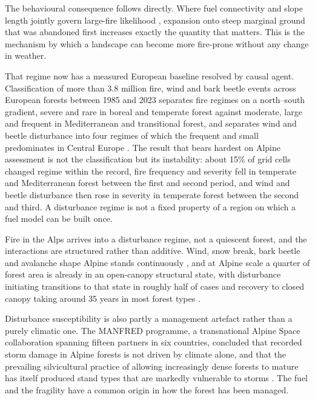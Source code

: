 \documentclass[11pt,a4paper]{article}
\begin{document}
The behavioural consequence follows directly. Where fuel connectivity and slope length jointly govern large-fire likelihood \citep{conedera_linking_2024}, expansion onto steep marginal ground that was abandoned first increases exactly the quantity that matters. This is the mechanism by which a landscape can become more fire-prone without any change in weather.

That regime now has a measured European baseline resolved by causal agent. Classification of more than 3.8 million fire, wind and bark beetle events across European forests between 1985 and 2023 separates fire regimes on a north--south gradient, severe and rare in boreal and temperate forest against moderate, large and frequent in Mediterranean and transitional forest, and separates wind and beetle disturbance into four regimes of which the frequent and small predominates in Central Europe \citep{miguel_unravelling_2026}. The result that bears hardest on Alpine assessment is not the classification but its instability: about 15\% of grid cells changed regime within the record, fire frequency and severity fell in temperate and Mediterranean forest between the first and second period, and wind and beetle disturbance then rose in severity in temperate forest between the second and third. A disturbance regime is not a fixed property of a region on which a fuel model can be built once.

Fire in the Alps arrives into a disturbance regime, not a quiescent forest, and the interactions are structured rather than additive. Wind, snow break, bark beetle and avalanche shape Alpine stands continuously \citep{bebi_changes_2017}, and at Alpine scale a quarter of forest area is already in an open-canopy structural state, with disturbance initiating transitions to that state in roughly half of cases and recovery to closed canopy taking around 35 years in most forest types \citep{stritih_alternative_2023}.

Disturbance susceptibility is also partly a management artefact rather than a purely climatic one. The MANFRED programme, a transnational Alpine Space collaboration spanning fifteen partners in six countries, concluded that recorded storm damage in Alpine forests is not driven by climate alone, and that the prevailing silvicultural practice of allowing increasingly dense forests to mature has itself produced stand types that are markedly vulnerable to storms \citep{jandl_management_2013}. The fuel and the fragility have a common origin in how the forest has been managed.
\end{document}
